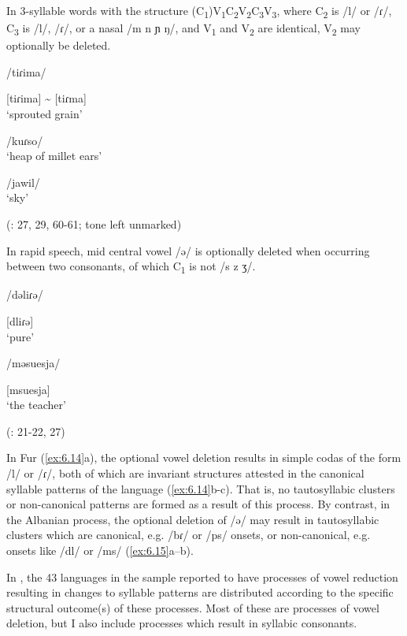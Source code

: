 \ea\label{ex:6.14}

  In 3-syllable words with the structure (C\textsubscript{1})V\textsubscript{1}C\textsubscript{2}V\textsubscript{2}C\textsubscript{3}V\textsubscript{3}, where C\textsubscript{2} is /l/ or /ɾ/, C\textsubscript{3} is /l/, /ɾ/, or a nasal /m n ɲ ŋ/, and V\textsubscript{1} and V\textsubscript{2} are identical, V\textsubscript{2} may optionally be deleted.

\ea  /tiɾima/

[tiɾima] {\textasciitilde} [tiɾma]\\
\glt ‘sprouted grain’

\ex  /kuɾso/\\
\glt ‘heap of millet ears’

\ex  /jawil/\\
\glt ‘sky’

(\citealt{Jakobi1990}: 27, 29, 60-61; tone left unmarked)
\z
\z

\ea\label{ex:6.15}

  In rapid speech, mid central vowel /ə/ is optionally deleted when occurring between two consonants, of which C\textsubscript{1} is not /s z ʒ/.

\ea  /dəliɾə/

[dliɾə]\\
\glt ‘pure’

\ex  /məsuesja/

[msuesja]\\
\glt ‘the teacher’

(\citealt{Klippenstein2010}: 21-22, 27)
\z
\z

  In Fur (\ref{ex:6.14}a), the optional vowel deletion results in simple codas of the form /l/ or /ɾ/, both of which are invariant structures attested in the canonical syllable patterns of the language (\ref{ex:6.14}b-c). That is, no tautosyllabic clusters or non-canonical patterns are formed as a result of this process. By contrast, in the Albanian process, the optional deletion of /ə/ may result in tautosyllabic clusters which are canonical, e.g. /bɾ/ or /ps/ onsets, or non-canonical, e.g. onsets like /dl/ or /ms/ (\ref{ex:6.15}a--b).

  In , the 43 languages in the sample reported to have processes of vowel reduction resulting in changes to syllable patterns are distributed according to the specific structural outcome(s) of these processes. Most of these are processes of vowel deletion, but I also include processes which result in syllabic consonants.

